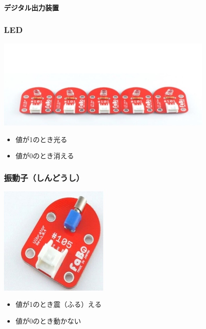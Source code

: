 \begin{frame}[plain]
    \begin{center}
        \vspace{48pt}
        {\huge\bf デジタル出力装置}
    \end{center}
\end{frame}

\begin{frame}
    \frametitle{LED}
    \begin{center}
        \includegraphics[width=0.8\textwidth]{images/chap05/text05-img016.png}
        \begin{itemize}
            \item 値が1のとき光る
            \item 値が0のとき消える
        \end{itemize}
    \end{center}
\end{frame}

\begin{frame}
    \frametitle{振動子（しんどうし）}
    \begin{center}
        \includegraphics[width=0.4\textwidth]{images/chap05/text05-img017.png}
        \begin{itemize}
            \item 値が1のとき震（ふる）える
            \item 値が0のとき動かない
        \end{itemize}
    \end{center}
\end{frame}

